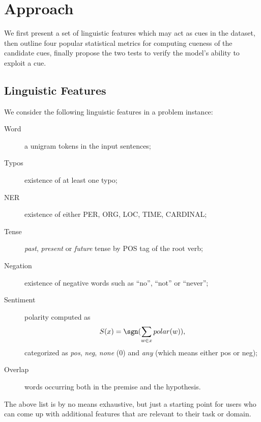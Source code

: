 \section{Approach}
\label{sec:approach}
We first present a set of linguistic features which may act as cues in
the dataset, then outline four popular statistical metrics for computing
cueness of the candidate cues, finally propose the two tests to
verify the model's ability to exploit a cue.

\subsection{Linguistic Features}
\label{sec:extract}
We consider the following linguistic features in a problem instance:
\begin{description}
\item[Word] a unigram tokens in the input sentences; 
\item [Typos] existence of at least one typo;
\item [NER] existence of either PER, ORG, LOC, TIME, CARDINAL; 
\item[Tense] \textit{past}, \textit{present} or \textit{future} tense by POS tag of the root verb;
\item[Negation] existence of negative words such as ``no'', ``not'' or ``never''; 
\item[Sentiment] polarity computed as \[S(x) = \sgn(\sum_{w \in x} polar(w)),\]
categorized as \textit{pos}, \textit{neg}, \textit{none} (0) and \textit{any} (which
means either pos or neg);
\item[Overlap] words occurring both in the premise and the hypothesis. 
\end{description}
The above list is by no means exhaustive, but just a starting point for users 
who can come up with additional features that are relevant
to their task or domain. 

